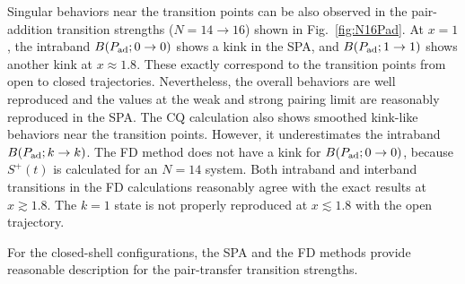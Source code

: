 \documentclass[%
superscriptaddress,
preprint,
showpacs,
nofootinbib,
amsmath,amssymb,
aps,
prc,
floatfix ]%
{revtex4-1}
\begin{document}
Singular behaviors near the transition points can be also observed in
the pair-addition transition strengths ($N=14\rightarrow 16$) shown
in Fig.~\ref{fig:N16Pad}. 
At $x=1$, the intraband $B(P_{\rm ad}; 0\rightarrow 0)$ shows a kink
in the SPA,
and $B(P_{\rm ad}; 1\rightarrow 1)$ shows another kink at $x\approx 1.8$.
These exactly correspond to the transition points from open to closed
trajectories.
Nevertheless, the overall behaviors are well reproduced and
the values at the weak and strong pairing limit are reasonably reproduced
in the SPA.
The CQ calculation also shows smoothed kink-like behaviors near the
transition points.
However, it underestimates the intraband $B(P_{\rm ad}; k\rightarrow k)$.
The FD method does not have a kink for $B(P_{\rm ad}; 0\rightarrow 0)$,
because $S^+(t)$ is calculated for an $N=14$ system.
Both intraband and interband transitions in the FD calculations
reasonably agree with the exact results at $x\gtrsim 1.8$.
The $k=1$ state is not properly reproduced at $x\lesssim 1.8$
with the open trajectory.

For the closed-shell configurations,
the SPA and the FD methods provide reasonable description for the
pair-transfer transition strengths.


\end{document}
